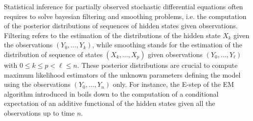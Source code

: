\documentclass[12pt]{article}
\newcommand{\rmd}{\mathrm{d}}
\newcommand{\eqsp}{\;}
\newcommand{\1}{\mathrm{1}}
\newcommand{\qk}{q_{k}}
\begin{document}
Statistical inference for partially observed stochastic differential equations often requires to solve bayesian filtering and smoothing problems, i.e. the computation of the posterior distributions of sequences of hidden states given observations. Filtering refers to the estimation of the distributions of the hidden state $X_k$ given the observations $(Y_0,\ldots,Y_k)$, while smoothing stands for the estimation of the distribution of sequence of states $(X_{k},\ldots,X_{p})$ given observations $(Y_{0},\ldots,Y_{\ell})$ with $0\le k\le p<\ell \le n$. 
These posterior distributions are crucial to compute maximum likelihood estimators of the unknown parameters defining the model using the observations $(Y_0,\ldots,Y_n)$ only.
For instance, the E-step of the EM algorithm introduced in \cite{dempster:laird:rubin:1977} %
boils down to the computation of a conditional expectation of an additive functional of the hidden states given all the observations up to time $n$. 
\end{document}
